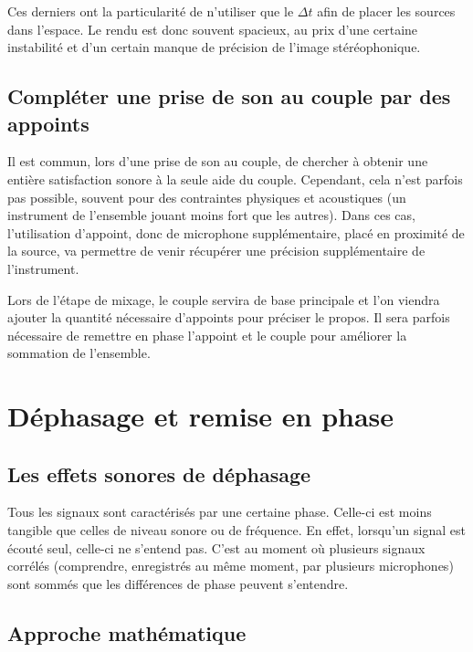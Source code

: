 \documentclass[
  letterpaper,
  DIV=11,
  numbers=noendperiod]{scrreprt}
\begin{document}
Ces derniers ont la particularité de n'utiliser que le \(\Delta t\) afin
de placer les sources dans l'espace. Le rendu est donc souvent spacieux,
au prix d'une certaine instabilité et d'un certain manque de précision
de l'image stéréophonique.

\hypertarget{compluxe9ter-une-prise-de-son-au-couple-par-des-appoints}{%
\section{Compléter une prise de son au couple par des
appoints}\label{compluxe9ter-une-prise-de-son-au-couple-par-des-appoints}}

Il est commun, lors d'une prise de son au couple, de chercher à obtenir
une entière satisfaction sonore à la seule aide du couple. Cependant,
cela n'est parfois pas possible, souvent pour des contraintes physiques
et acoustiques (un instrument de l'ensemble jouant moins fort que les
autres). Dans ces cas, l'utilisation d'appoint, donc de microphone
supplémentaire, placé en proximité de la source, va permettre de venir
récupérer une précision supplémentaire de l'instrument.

Lors de l'étape de mixage, le couple servira de base principale et l'on
viendra ajouter la quantité nécessaire d'appoints pour préciser le
propos. Il sera parfois nécessaire de remettre en phase l'appoint et le
couple pour améliorer la sommation de l'ensemble.

\hypertarget{duxe9phasage-et-remise-en-phase}{%
\chapter{Déphasage et remise en
phase}\label{duxe9phasage-et-remise-en-phase}}

\hypertarget{les-effets-sonores-de-duxe9phasage}{%
\section{Les effets sonores de
déphasage}\label{les-effets-sonores-de-duxe9phasage}}

Tous les signaux sont caractérisés par une certaine phase. Celle-ci est
moins tangible que celles de niveau sonore ou de fréquence. En effet,
lorsqu'un signal est écouté seul, celle-ci ne s'entend pas. C'est au
moment où plusieurs signaux corrélés (comprendre, enregistrés au même
moment, par plusieurs microphones) sont sommés que les différences de
phase peuvent s'entendre.

\hypertarget{approche-mathuxe9matique}{%
\section{Approche mathématique}\label{approche-mathuxe9matique}}
\end{document}
